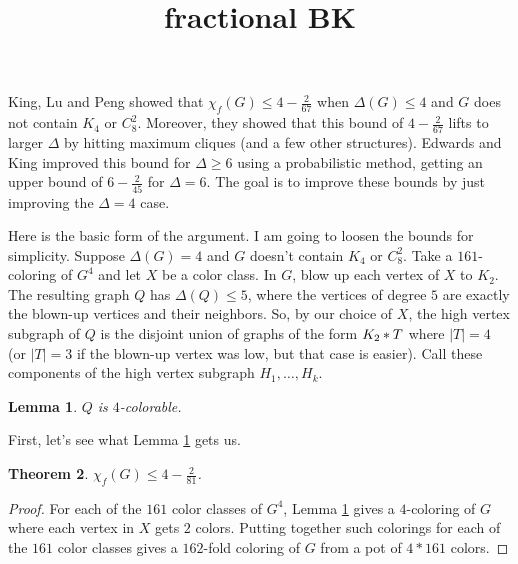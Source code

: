 \documentclass[12pt]{article}
\theoremstyle{plain}
\newtheorem{thm}{Theorem}[section]
\newtheorem{lem}[thm]{Lemma}
\theoremstyle{definition}
\theoremstyle{remark}
\newcommand{\join}[2]{#1 \mbox{\hspace{2 pt}$\ast$\hspace{2 pt}} #2}
\begin{document}
\title{fractional BK}
\maketitle

King, Lu and Peng \cite{king2012fractional} showed that $\chi_f(G) \le 4 - \frac{2}{67}$ when $\Delta(G) \le 4$ and $G$ does not contain $K_4$ or $C_8^2$.  Moreover, they showed that this bound of $4 - \frac{2}{67}$ lifts to larger $\Delta$ by hitting maximum cliques (and a few other structures).  Edwards and King improved this bound for $\Delta \ge 6$ using a probabilistic method, getting an upper bound of $6 - \frac{2}{45}$ for $\Delta=6$.  The goal is to improve these bounds by just improving the $\Delta=4$ case.

Here is the basic form of the argument.  I am going to loosen the bounds for simplicity.  Suppose $\Delta(G) = 4$ and $G$ doesn't contain $K_4$ or $C_8^2$.  Take a $161$-coloring of $G^4$ and let $X$ be a color class.  In $G$, blow up each vertex of $X$ to $K_2$.  The resulting graph $Q$ has $\Delta(Q) \le 5$, where the vertices of degree $5$ are exactly the blown-up vertices and their neighbors.  So, by our choice of $X$, the high vertex subgraph of $Q$ is the disjoint union of graphs of the form $\join{K_2}{T}$ where $|T| = 4$ (or $|T| = 3$ if the blown-up vertex was low, but that case is easier).  Call these components of the high vertex subgraph $H_1, \ldots, H_k$.

\begin{lem}\label{FourColorability}
$Q$ is $4$-colorable.
\end{lem}

First, let's see what Lemma \ref{FourColorability} gets us.

\begin{thm}
$\chi_f(G) \le 4 - \frac{2}{81}$.
\end{thm}
\begin{proof}
For each of the $161$ color classes of $G^4$, Lemma \ref{FourColorability} gives a $4$-coloring of $G$ where each vertex in $X$ gets $2$ colors.  Putting together such colorings for each of the $161$ color classes gives a $162$-fold coloring of $G$ from a pot of $4 * 161$ colors.
\end{proof}
\end{document}
